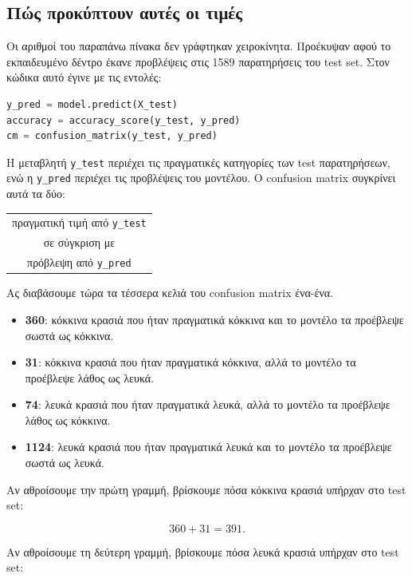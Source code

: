 \documentclass[12pt,a4paper]{article}
\newcommand{\code}[1]{\texttt{\textenglish{#1}}}
\begin{document}
\subsection{Πώς προκύπτουν αυτές οι τιμές}

Οι αριθμοί του παραπάνω πίνακα δεν γράφτηκαν χειροκίνητα. Προέκυψαν αφού το
εκπαιδευμένο δέντρο έκανε προβλέψεις στις 1589 παρατηρήσεις του test set.
Στον κώδικα αυτό έγινε με τις εντολές:

\begin{lstlisting}[language=Python]
y_pred = model.predict(X_test)
accuracy = accuracy_score(y_test, y_pred)
cm = confusion_matrix(y_test, y_pred)
\end{lstlisting}

Η μεταβλητή \code{y\_test} περιέχει τις πραγματικές κατηγορίες των test
παρατηρήσεων, ενώ η \code{y\_pred} περιέχει τις προβλέψεις του μοντέλου. Ο
confusion matrix συγκρίνει αυτά τα δύο:

\begin{center}
\begin{tabular}{c}
πραγματική τιμή από \code{y\_test} \\
σε σύγκριση με \\
πρόβλεψη από \code{y\_pred}
\end{tabular}
\end{center}

Ας διαβάσουμε τώρα τα τέσσερα κελιά του confusion matrix ένα-ένα.

\begin{itemize}
    \item \textbf{360}: κόκκινα κρασιά που ήταν πραγματικά κόκκινα και το
    μοντέλο τα προέβλεψε σωστά ως κόκκινα.
    \item \textbf{31}: κόκκινα κρασιά που ήταν πραγματικά κόκκινα, αλλά το
    μοντέλο τα προέβλεψε λάθος ως λευκά.
    \item \textbf{74}: λευκά κρασιά που ήταν πραγματικά λευκά, αλλά το μοντέλο
    τα προέβλεψε λάθος ως κόκκινα.
    \item \textbf{1124}: λευκά κρασιά που ήταν πραγματικά λευκά και το μοντέλο
    τα προέβλεψε σωστά ως λευκά.
\end{itemize}

Αν αθροίσουμε την πρώτη γραμμή, βρίσκουμε πόσα κόκκινα κρασιά υπήρχαν στο test
set:

\[
    360 + 31 = 391.
\]

Αν αθροίσουμε τη δεύτερη γραμμή, βρίσκουμε πόσα λευκά κρασιά υπήρχαν στο test
set:
\end{document}
